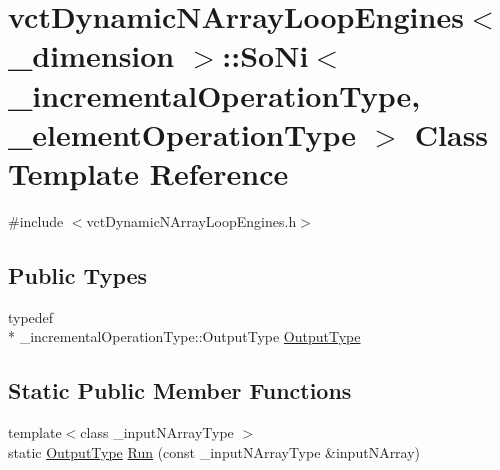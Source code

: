 \hypertarget{classvct_dynamic_n_array_loop_engines_1_1_so_ni}{\section{vct\-Dynamic\-N\-Array\-Loop\-Engines$<$ \-\_\-dimension $>$\-:\-:So\-Ni$<$ \-\_\-incremental\-Operation\-Type, \-\_\-element\-Operation\-Type $>$ Class Template Reference}
\label{classvct_dynamic_n_array_loop_engines_1_1_so_ni}
}


{\ttfamily \#include $<$vct\-Dynamic\-N\-Array\-Loop\-Engines.\-h$>$}

\subsection*{Public Types}
\begin{DoxyCompactItemize}
\item 
typedef \\*
\-\_\-incremental\-Operation\-Type\-::\-Output\-Type \hyperlink{classvct_dynamic_n_array_loop_engines_1_1_so_ni_a53b13177ad4d406a426f32d72f109ab8}{Output\-Type}
\end{DoxyCompactItemize}
\subsection*{Static Public Member Functions}
\begin{DoxyCompactItemize}
\item 
{\footnotesize template$<$class \-\_\-input\-N\-Array\-Type $>$ }\\static \hyperlink{classvct_dynamic_n_array_loop_engines_1_1_so_ni_a53b13177ad4d406a426f32d72f109ab8}{Output\-Type} \hyperlink{classvct_dynamic_n_array_loop_engines_1_1_so_ni_a90941b9548b4ec0e3df543ae8e746dea}{Run} (const \-\_\-input\-N\-Array\-Type \&input\-N\-Array)
\end{DoxyCompactItemize}


